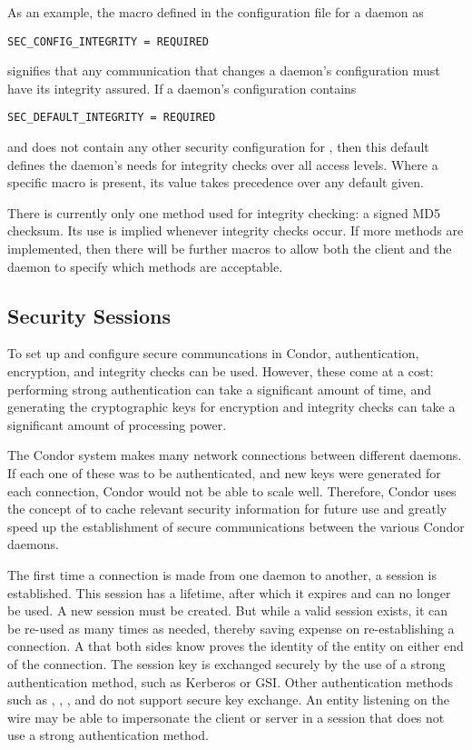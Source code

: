 As an example, the macro defined in the configuration file
for a daemon as
\begin{verbatim}
SEC_CONFIG_INTEGRITY = REQUIRED
\end{verbatim}
signifies that any communication that changes a daemon's configuration
must have its integrity assured.
If a daemon's configuration contains
\begin{verbatim}
SEC_DEFAULT_INTEGRITY = REQUIRED
\end{verbatim}
and does not contain any other security configuration for
\verb@INTEGRITY@, then this default defines the daemon's needs
for integrity checks over all access levels.
Where a specific macro is present, its value takes
precedence over any default given.

There is currently only one method used for integrity checking:
a signed MD5 checksum.
Its use is implied whenever integrity checks occur.
If more methods are implemented, then there will be further
macros to allow both the client and the daemon to specify
which methods are acceptable.


\subsection{\label{sec:Security-Sessions}Security Sessions}

To set up and configure secure communcations in Condor,
authentication, encryption, and integrity checks can be used.  
However, these come at a cost: performing strong authentication can
take a significant amount of time, and  generating the cryptographic
keys for encryption and integrity checks can take a significant amount
of processing power. 

The Condor system makes many network connections between different
daemons.  
If each one of these was to be authenticated,
and new keys were generated for each connection,
Condor would not be able to scale well.  
Therefore, Condor uses the concept of  to cache
relevant security information for future use and greatly speed up the
establishment of secure communications between the various Condor
daemons.

The first time a connection is made from one daemon to another, a
session is established.  
This session has a lifetime,
after which it expires and can no longer be used.
A new session must be created.
But while a valid session exists, it can be re-used as many times as
needed, thereby saving expense on re-establishing a connection. 
A  that both sides know proves the
identity of the entity on either end of the connection.
The session key is exchanged securely by the use of
a strong authentication method, such as Kerberos or GSI. 
Other authentication methods such as ,
,  , and
 do not support secure key exchange.
An entity
listening on the wire may be able to impersonate the client or server
in a session that does not use a strong authentication method. 

